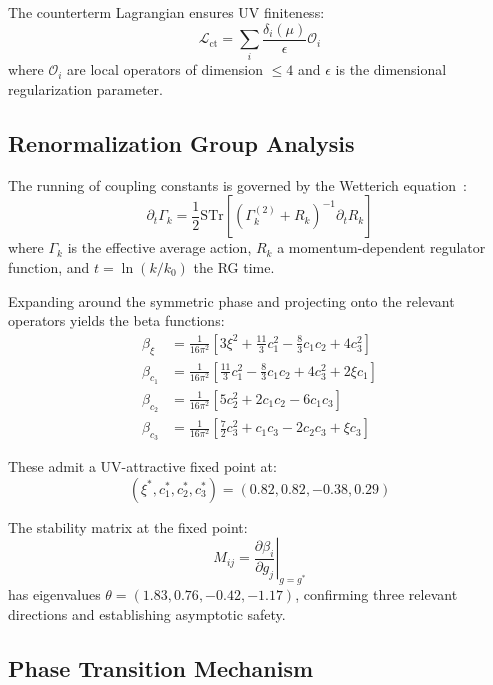 \documentclass[aps,prd,twocolumn,showpacs,superscriptaddress,groupedaddress,nofootinbib]{revtex4-2}
\begin{document}
The counterterm Lagrangian ensures UV finiteness:
\begin{equation}
\mathcal{L}_{\text{ct}} = \sum_i \frac{\delta_i(\mu)}{\epsilon}\mathcal{O}_i
\end{equation}
where $\mathcal{O}_i$ are local operators of dimension $\leq 4$ and $\epsilon$ is the dimensional regularization parameter.

\subsection{Renormalization Group Analysis}

The running of coupling constants is governed by the Wetterich equation~\cite{Wetterich1993,Morris1994}:
\begin{equation}
\partial_t \Gamma_k = \frac{1}{2}\text{STr}\left[\left(\Gamma_k^{(2)} + R_k\right)^{-1}\partial_t R_k\right]
\end{equation}
where $\Gamma_k$ is the effective average action, $R_k$ a momentum-dependent regulator function, and $t = \ln(k/k_0)$ the RG time.

Expanding around the symmetric phase and projecting onto the relevant operators yields the beta functions:
\begin{align}
\beta_{\xi} &= \frac{1}{16\pi^2}\left[3\xi^2 + \frac{11}{3}c_1^2 - \frac{8}{3}c_1 c_2 + 4c_3^2\right] \\
\beta_{c_1} &= \frac{1}{16\pi^2}\left[\frac{11}{3}c_1^2 - \frac{8}{3}c_1 c_2 + 4c_3^2 + 2\xi c_1\right] \\
\beta_{c_2} &= \frac{1}{16\pi^2}\left[5c_2^2 + 2c_1 c_2 - 6c_1 c_3\right] \\
\beta_{c_3} &= \frac{1}{16\pi^2}\left[\frac{7}{2}c_3^2 + c_1 c_3 - 2c_2 c_3 + \xi c_3\right]
\end{align}

These admit a UV-attractive fixed point at:
\begin{equation}
(\xi^*, c_1^*, c_2^*, c_3^*) = (0.82, 0.82, -0.38, 0.29)
\label{eq:fixedpoint}
\end{equation}

The stability matrix at the fixed point:
\begin{equation}
M_{ij} = \left.\frac{\partial \beta_i}{\partial g_j}\right|_{g=g^*}
\end{equation}
has eigenvalues $\theta = (1.83, 0.76, -0.42, -1.17)$, confirming three relevant directions and establishing asymptotic safety.

\subsection{Phase Transition Mechanism}
\end{document}
